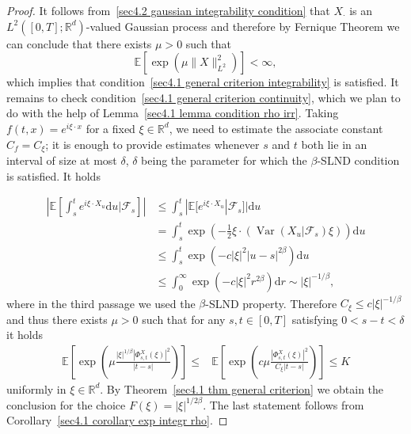 \documentclass[10pt]{article}
\newcommand{\mathd}{\mathrm{d}}
\newcommand{\nobracket}{}
\newcommand{\tmop}[1]{\ensuremath{\operatorname{#1}}}
\begin{document}
\begin{proof}
  It follows from~\eqref{sec4.2 gaussian integrability condition} that
  $X_{\cdot}$ is an $L^2 ([0, T] ; \mathbb{R}^d)$-valued Gaussian process and
  therefore by Fernique Theorem we can conclude that there exists $\mu > 0$
  such that
  \[ \mathbb{E} [\exp (\mu \| X \|_{L^2}^2)] < \infty, \]
  which implies that condition~\eqref{sec4.1 general criterion integrability}
  is satisfied. It remains to check condition~\eqref{sec4.1 general criterion
  continuity}, which we plan to do with the help of Lemma~\ref{sec4.1 lemma
  condition rho irr}. Taking $f (t, x) = e^{i \xi \cdot x}$ for a fixed $\xi
  \in \mathbb{R}^d$, we need to estimate the associate constant $C_f =
  C_{\xi}$; it is enough to provide estimates whenever $s$ and $t$ both lie in
  an interval of size at most $\delta$, $\delta$ being the parameter for which
  the $\beta$\mbox{-}SLND condition is satisfied. It holds
  
  \begin{align}
    \left| \mathbb{E} \left[ \int_s^t e^{i \xi \cdot X_u} \mathd u |
    \mathcal{F}_s \nobracket \right] \right| & \leqslant \int_s^t | \mathbb{E}
    [e^{i \xi \cdot X_u} | \mathcal{F}_s \nobracket] | \mathd u \nonumber\\
    & = \int_s^t \exp \left( - \frac{1}{2} \xi \cdot (\tmop{Var} (X_u |
    \mathcal{F}_s \nobracket) \xi) \right) \mathd u \nonumber\\
    & \leqslant \int_s^t \exp (- c | \xi |^2 | u - s |^{2 \beta}) \mathd u
    \nonumber\\
    & \leqslant \int_0^{\infty} \exp (- c | \xi |^2 r^{2 \beta}) \mathd r
    \sim | \xi |^{- 1 / \beta}, \nonumber
  \end{align}
%  
  where in the third passage we used the $\beta$-SLND property. Therefore
  $C_{\xi} \leqslant c | \xi |^{- 1 / \beta}$ and thus there exists $\mu > 0$
  such that for any $s, t \in [0, T]$ satisfying $0 < s - t < \delta$ it holds
%  
  \begin{align}
    \mathbb{E} \left[ \exp \left( \mu \frac{| \xi |^{1 / \beta} | \Phi_{s,
    t}^X (\xi) |^2}{| t - s |} \right) \right] \leqslant & \mathbb{E} \left[
    \exp \left( c \mu \frac{| \Phi_{s, t}^X (\xi) |^2}{C_{\xi} | t - s |}
    \right) \right] \leqslant K \nonumber
  \end{align}
%  
  uniformly in $\xi \in \mathbb{R}^d$. By Theorem~\ref{sec4.1 thm general
  criterion} we obtain the conclusion for the choice $F (\xi) = | \xi |^{1 / 2
  \beta}$. The last statement follows from Corollary~\ref{sec4.1 corollary exp
  integr rho}.
\end{proof}
\end{document}
